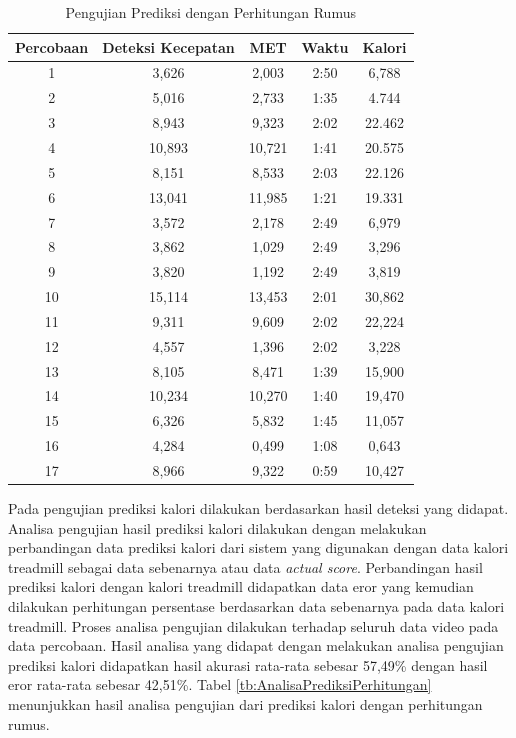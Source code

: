 \begin{longtable}{|c|c|c|c|c|}
  \caption{Pengujian Prediksi dengan Perhitungan Rumus}
  \label{tb:PengujianPrediksiPerhitungan}                                   \\
  \hline
  \rowcolor[HTML]{C0C0C0}
  \textbf{Percobaan} & \textbf{Deteksi Kecepatan} & \textbf{MET} & \textbf{Waktu} & \textbf{Kalori} \\
  \hline
  1   & 3,626   & 2,003    & 2:50    & 6,788   \\
  \hline
  2   & 5,016   & 2,733    & 1:35    & 4.744   \\
  \hline
  3   & 8,943   & 9,323    & 2:02    & 22.462  \\
  \hline
  4   & 10,893  & 10,721   & 1:41    & 20.575  \\
  \hline
  5   & 8,151   & 8,533    & 2:03    & 22.126  \\
  \hline
  6   & 13,041  & 11,985   & 1:21    & 19.331  \\
  \hline
  7   & 3,572   & 2,178    & 2:49    & 6,979  \\
  \hline
  8   & 3,862   & 1,029    & 2:49    & 3,296  \\
  \hline
  9   & 3,820   & 1,192    & 2:49    & 3,819  \\
  \hline
  10   & 15,114   & 13,453   & 2:01    & 30,862  \\
  \hline
  11   & 9,311   & 9,609   & 2:02    & 22,224  \\
  \hline
  12   & 4,557   & 1,396   & 2:02    & 3,228  \\
  \hline
  13   & 8,105   & 8,471   & 1:39    & 15,900  \\
  \hline
  14   & 10,234   & 10,270   & 1:40    & 19,470  \\
  \hline
  15   & 6,326   & 5,832   & 1:45    & 11,057  \\
  \hline
  16   & 4,284   & 0,499    & 1:08    & 0,643  \\
  \hline
  17   & 8,966   & 9,322   & 0:59    & 10,427  \\
  \hline
\end{longtable}

Pada pengujian prediksi kalori dilakukan berdasarkan hasil deteksi yang didapat. Analisa pengujian hasil prediksi kalori dilakukan dengan melakukan perbandingan data prediksi kalori dari sistem yang digunakan dengan data kalori treadmill sebagai data sebenarnya atau data \emph{actual score}. Perbandingan hasil prediksi kalori dengan kalori treadmill didapatkan data eror yang kemudian dilakukan perhitungan persentase berdasarkan data sebenarnya pada data kalori treadmill. Proses analisa pengujian dilakukan terhadap seluruh data video pada data percobaan. Hasil analisa yang didapat dengan melakukan analisa pengujian prediksi kalori didapatkan hasil akurasi rata-rata sebesar 57,49\% dengan hasil eror rata-rata sebesar 42,51\%. Tabel \ref{tb:AnalisaPrediksiPerhitungan} menunjukkan hasil analisa pengujian dari prediksi kalori dengan perhitungan rumus.

